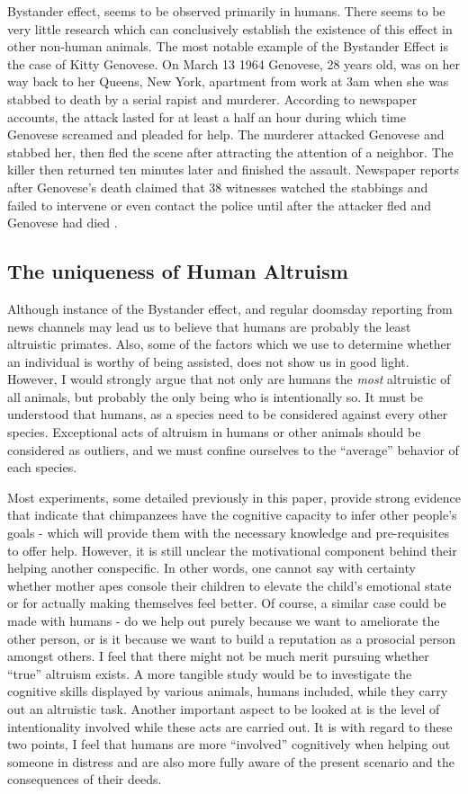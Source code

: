 \documentclass[12pt, letter]{article}
\begin{document}
Bystander effect, seems to be observed primarily in humans. There seems to be very little research which can conclusively establish the existence of this effect in other non-human animals. The most notable example of the Bystander Effect is the case of Kitty Genovese. On March 13 1964 Genovese, 28 years old, was on her way back to her Queens, New York, apartment from work at 3am when she was stabbed to death by a serial rapist and murderer. According to newspaper accounts, the attack lasted for at least a half an hour during which time Genovese screamed and pleaded for help. The murderer attacked Genovese and stabbed her, then fled the scene after attracting the attention of a neighbor. The killer then returned ten minutes later and finished the assault. Newspaper reports after Genovese's death claimed that 38 witnesses watched the stabbings and failed to intervene or even contact the police until after the attacker fled and Genovese had died  \cite{gansberg196438}.

\subsection*{The uniqueness of Human Altruism}
Although instance of the Bystander effect, and regular doomsday reporting from news channels may lead us to believe that humans are probably the least altruistic primates. Also, some of the factors which we use to determine whether an individual is worthy of being assisted, does not show us in good light. However, I would strongly argue that not only are humans the \emph{most} altruistic of all animals, but probably the only being who is intentionally so. It must be understood that humans, as a species need to be considered against every other species. Exceptional acts of altruism in humans or other animals should be considered as outliers, and we must confine ourselves to the ``average'' behavior of each species.

Most experiments, some detailed previously in this paper, provide strong evidence that indicate that chimpanzees have the cognitive capacity to infer other people's goals - which will provide them with the necessary knowledge and pre-requisites to offer help. However, it is still unclear the motivational component behind their helping another conspecific. In other words, one cannot say with certainty whether mother apes console their children to elevate the child's emotional state or for actually making themselves feel better. Of course, a similar case could be made with humans - do we help out purely because we want to ameliorate the other person, or is it because we want to build a reputation as a prosocial person amongst others. I feel that there might not be much merit pursuing whether ``true'' altruism exists. A more tangible study would be to investigate the cognitive skills displayed by various animals, humans included, while they carry out an altruistic task. Another important aspect to be looked at is the level of intentionality involved while these acts are carried out. It is with regard to these two points, I feel that humans are more ``involved'' cognitively when helping out someone in distress and are also more fully aware of the present scenario and the consequences of their deeds.
\end{document}
